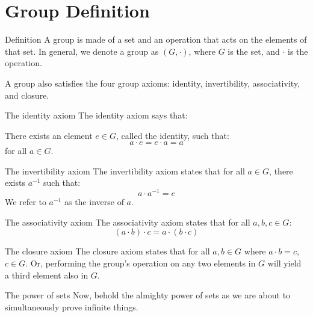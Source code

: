 \section{Group Definition}
\begin{namedframe}{Definition}
	A group is made of a set and an operation that acts on the elements of that set. In general, we denote a group as $(G, \cdot)$, where $G$ is the set, and $\cdot$ is the operation.

	A group also satisfies the four group axioms: identity, invertibility, associativity, and closure.
\end{namedframe}
\begin{namedframe}{The identity axiom}
	The identity axiom says that:

	There exists an element $e \in G$, called the identity, such that:
	\[a \cdot e = e \cdot a = a\]
	for all $a \in G$.
\end{namedframe}
\begin{namedframe}{The invertibility axiom}
	The invertibility axiom states that for all $a \in G$, there exists $a^{-1}$ such that:
	\[a \cdot a^{-1} = e\]
	We refer to $a^{-1}$ as the inverse of $a$.
\end{namedframe}
\begin{namedframe}{The associativity axiom}
	The associativity axiom states that for all $a, b, c \in G$:
	\[(a \cdot b) \cdot c = a \cdot (b \cdot c)\]
\end{namedframe}
\begin{namedframe}{The closure axiom}
	The closure axiom states that for all $a, b \in G$ where $a \cdot b = c$, $c \in G$.
	\vertspace
	Or, performing the group's operation on any two elements in $G$ will yield a third element also in $G$.
\end{namedframe}
\begin{namedframe}{The power of sets}
	Now, behold the almighty power of sets as we are about to simultaneously prove infinite things.
\end{namedframe}
